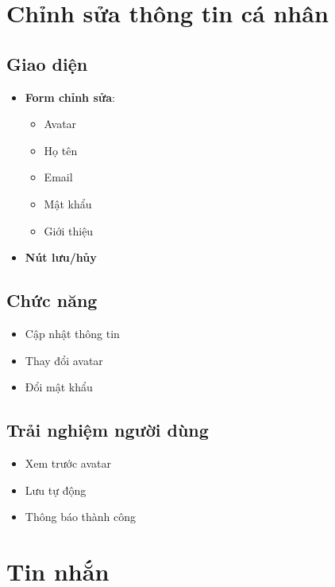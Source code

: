 \documentclass{article}
\begin{document}
\section{Chỉnh sửa thông tin cá nhân}
\subsection{Giao diện}
\begin{itemize}
    \item \textbf{Form chỉnh sửa}:
    \begin{itemize}
        \item Avatar
        \item Họ tên
        \item Email
        \item Mật khẩu
        \item Giới thiệu
    \end{itemize}
    \item \textbf{Nút lưu/hủy}
\end{itemize}

\subsection{Chức năng}
\begin{itemize}
    \item Cập nhật thông tin
    \item Thay đổi avatar
    \item Đổi mật khẩu
\end{itemize}

\subsection{Trải nghiệm người dùng}
\begin{itemize}
    \item Xem trước avatar
    \item Lưu tự động
    \item Thông báo thành công
\end{itemize}

\section{Tin nhắn}
\end{document}
